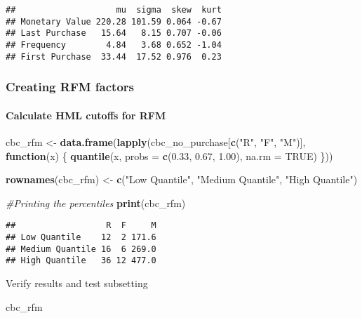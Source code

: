 \documentclass[
]{article}
\newenvironment{Shaded}{\begin{snugshade}}{\end{snugshade}}
\newcommand{\AttributeTok}[1]{\textcolor[rgb]{0.13,0.29,0.53}{#1}}
\newcommand{\CommentTok}[1]{\textcolor[rgb]{0.56,0.35,0.01}{\textit{#1}}}
\newcommand{\ConstantTok}[1]{\textcolor[rgb]{0.56,0.35,0.01}{#1}}
\newcommand{\ControlFlowTok}[1]{\textcolor[rgb]{0.13,0.29,0.53}{\textbf{#1}}}
\newcommand{\FloatTok}[1]{\textcolor[rgb]{0.00,0.00,0.81}{#1}}
\newcommand{\FunctionTok}[1]{\textcolor[rgb]{0.13,0.29,0.53}{\textbf{#1}}}
\newcommand{\NormalTok}[1]{#1}
\newcommand{\OtherTok}[1]{\textcolor[rgb]{0.56,0.35,0.01}{#1}}
\newcommand{\StringTok}[1]{\textcolor[rgb]{0.31,0.60,0.02}{#1}}
\begin{document}
\begin{verbatim}
##                    mu  sigma  skew  kurt
## Monetary Value 220.28 101.59 0.064 -0.67
## Last Purchase   15.64   8.15 0.707 -0.06
## Frequency        4.84   3.68 0.652 -1.04
## First Purchase  33.44  17.52 0.976  0.23
\end{verbatim}

\subsubsection{Creating RFM factors}\label{creating-rfm-factors}

\paragraph{Calculate HML cutoffs for
RFM}\label{calculate-hml-cutoffs-for-rfm}

\begin{Shaded}
\begin{Highlighting}[]
\NormalTok{cbc\_rfm }\OtherTok{\textless{}{-}} \FunctionTok{data.frame}\NormalTok{(}\FunctionTok{lapply}\NormalTok{(cbc\_no\_purchase[}\FunctionTok{c}\NormalTok{(}\StringTok{"R"}\NormalTok{, }\StringTok{"F"}\NormalTok{, }\StringTok{"M"}\NormalTok{)], }
  \ControlFlowTok{function}\NormalTok{(x) \{}
    \FunctionTok{quantile}\NormalTok{(x, }\AttributeTok{probs =} \FunctionTok{c}\NormalTok{(}\FloatTok{0.33}\NormalTok{, }\FloatTok{0.67}\NormalTok{, }\FloatTok{1.00}\NormalTok{), }\AttributeTok{na.rm =} \ConstantTok{TRUE}\NormalTok{) \}))}

\FunctionTok{rownames}\NormalTok{(cbc\_rfm) }\OtherTok{\textless{}{-}} \FunctionTok{c}\NormalTok{(}\StringTok{"Low Quantile"}\NormalTok{, }\StringTok{"Medium Quantile"}\NormalTok{, }\StringTok{"High Quantile"}\NormalTok{)}

\CommentTok{\#Printing the percentiles}
\FunctionTok{print}\NormalTok{(cbc\_rfm)}
\end{Highlighting}
\end{Shaded}

\begin{verbatim}
##                  R  F     M
## Low Quantile    12  2 171.6
## Medium Quantile 16  6 269.0
## High Quantile   36 12 477.0
\end{verbatim}

Verify results and test subsetting

\begin{Shaded}
\begin{Highlighting}[]
\NormalTok{cbc\_rfm}
\end{Highlighting}
\end{Shaded}
\end{document}
